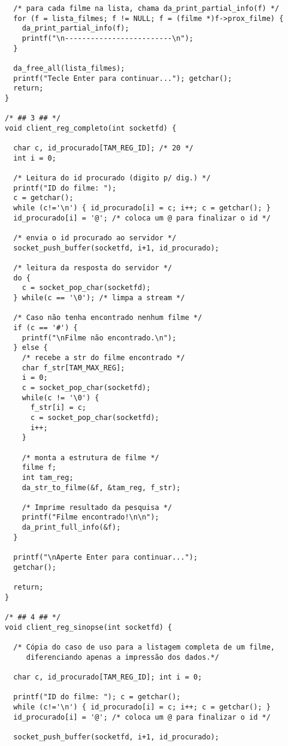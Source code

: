 \documentclass[11pt,twoside]{article}
\begin{document}
\begin{verbatim}
  /* para cada filme na lista, chama da_print_partial_info(f) */
  for (f = lista_filmes; f != NULL; f = (filme *)f->prox_filme) {
    da_print_partial_info(f);
    printf("\n-------------------------\n");
  }
	
  da_free_all(lista_filmes);
  printf("Tecle Enter para continuar..."); getchar();
  return;
}

/* ## 3 ## */
void client_reg_completo(int socketfd) {

  char c, id_procurado[TAM_REG_ID]; /* 20 */
  int i = 0;

  /* Leitura do id procurado (digito p/ dig.) */
  printf("ID do filme: ");
  c = getchar();
  while (c!='\n') { id_procurado[i] = c; i++; c = getchar(); }
  id_procurado[i] = '@'; /* coloca um @ para finalizar o id */

  /* envia o id procurado ao servidor */
  socket_push_buffer(socketfd, i+1, id_procurado);

  /* leitura da resposta do servidor */
  do {
    c = socket_pop_char(socketfd);
  } while(c == '\0'); /* limpa a stream */
  
  /* Caso não tenha encontrado nenhum filme */
  if (c == '#') {
    printf("\nFilme não encontrado.\n");
  } else {
    /* recebe a str do filme encontrado */
    char f_str[TAM_MAX_REG];
    i = 0;
    c = socket_pop_char(socketfd);
    while(c != '\0') { 
      f_str[i] = c;
      c = socket_pop_char(socketfd);
      i++;
    }

    /* monta a estrutura de filme */
    filme f;
    int tam_reg;
    da_str_to_filme(&f, &tam_reg, f_str);

    /* Imprime resultado da pesquisa */
    printf("Filme encontrado!\n\n");
    da_print_full_info(&f);
  }

  printf("\nAperte Enter para continuar...");
  getchar();

  return;
}

/* ## 4 ## */
void client_reg_sinopse(int socketfd) {

  /* Cópia do caso de uso para a listagem completa de um filme, 
     diferenciando apenas a impressão dos dados.*/
  
  char c, id_procurado[TAM_REG_ID]; int i = 0;

  printf("ID do filme: "); c = getchar();
  while (c!='\n') { id_procurado[i] = c; i++; c = getchar(); }
  id_procurado[i] = '@'; /* coloca um @ para finalizar o id */

  socket_push_buffer(socketfd, i+1, id_procurado);


\end{verbatim}
\end{document}

